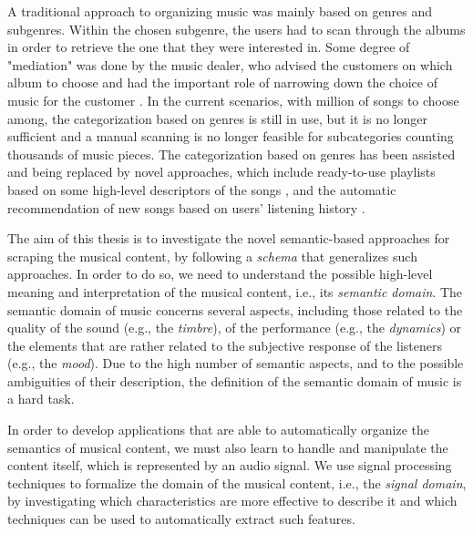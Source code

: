 A traditional approach to organizing music was mainly based on genres and subgenres. Within the chosen subgenre, the users had to scan through the albums in order to retrieve the one that they were interested in. Some degree of "mediation" was done by the music dealer, who advised the customers on which album to choose and had the important role of narrowing down the choice of music for the customer \cite{Zanoni2013Thesis}. In the current scenarios, with million of songs to choose among, the categorization based on genres is still in use, but it is no longer sufficient and a manual scanning is no longer feasible for subcategories counting thousands of music pieces. The categorization based on genres has been assisted and being replaced by novel approaches, which include ready-to-use playlists based on some high-level descriptors of the songs \cite{maillet2009steerable}, and the automatic recommendation of new songs based on users' listening history \cite{FtHandbook}.

The aim of this thesis is to investigate the novel semantic-based approaches for scraping the musical content, by following a \textit{schema} that generalizes such approaches. In order to do so, we need to understand the possible high-level meaning and interpretation of the musical content, i.e., its \textit{semantic domain}. The semantic domain of music concerns several aspects, including those related to the quality of the sound (e.g., the \textit{timbre}), of the performance (e.g., the \textit{dynamics}) or the elements that are rather related to the subjective response of the listeners (e.g., the \textit{mood}). Due to the high number of semantic aspects, and to the possible ambiguities of their description, the definition of the semantic domain of music is a hard task.

In order to develop applications that are able to automatically organize the semantics of musical content, we must also learn to handle and manipulate the content itself, which is represented by an audio signal. We use signal processing techniques to formalize the domain of the musical content, i.e., the \textit{signal domain}, by investigating which characteristics are more effective to describe it and which techniques can be used to automatically extract such features. 


